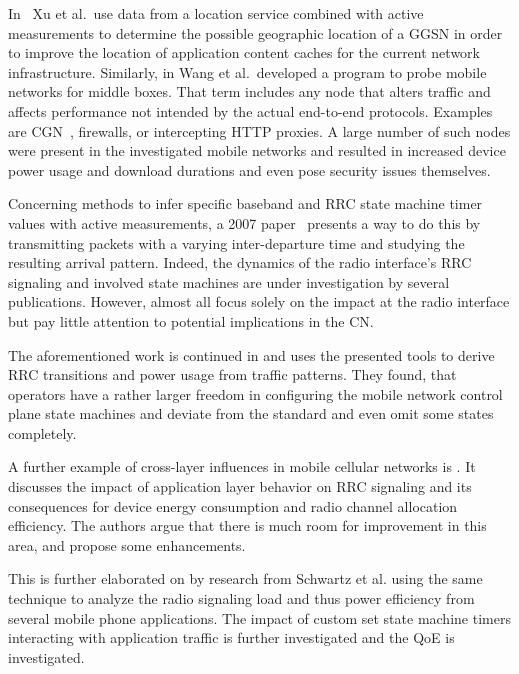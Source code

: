 In~\cite{Xu:2011:CDN:2007116.2007149} Xu et al.\ use data from a location service combined with active measurements to determine the possible geographic location of a \gls{GGSN} in order to improve the location of application content caches for the current network infrastructure. Similarly, in \cite{sigcomm11middleboxes} Wang et al.\ developed a program to probe mobile networks for middle boxes. That term includes any node that alters traffic and affects performance not intended by the actual end-to-end protocols. Examples are \gls{CGN}~\cite{rfc7021}, firewalls, or intercepting \gls{HTTP} proxies. A large number of such nodes were present in the investigated mobile networks and resulted in increased device power usage and download durations and even pose security issues themselves.

Concerning methods to infer specific baseband and \gls{RRC} state machine timer values with active measurements, a 2007 paper~\cite{4640935} presents a way to do this by transmitting packets with a varying inter-departure time and studying the resulting arrival pattern. Indeed, the dynamics of the radio interface's \gls{RRC} signaling and involved state machines are under investigation by several publications. However, almost all focus solely on the impact at the radio interface but pay little attention to potential implications in the \gls{CN}.

The aforementioned work is continued in \cite{5360763} and uses the presented tools to derive \gls{RRC} transitions and power usage from traffic patterns. They found, that operators have a rather larger freedom in configuring the mobile network control plane state machines and deviate from the standard and even omit some states completely.

A further example of cross-layer influences in mobile cellular networks is \cite{qian2011profiling}. It discusses the impact of application layer behavior on \gls{RRC} signaling and its consequences for device energy consumption and radio channel allocation efficiency. The authors argue that there is much room for improvement in this area, and propose some enhancements.

This is further elaborated on by research from Schwartz et al.\cite{schwartz2013angrybirds} using the same technique to analyze the radio signaling load and thus power efficiency from several mobile phone applications. The impact of custom set state machine timers interacting with application traffic is further investigated and the \gls{QoE} is investigated.


